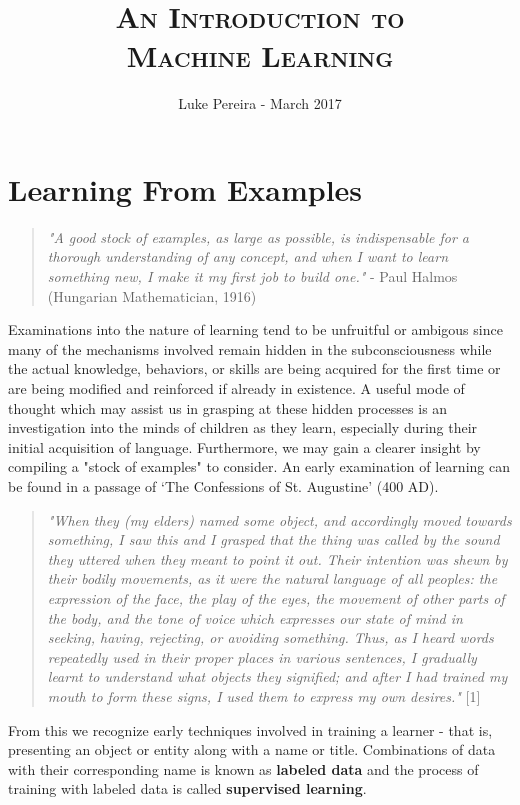 \documentclass[12pt]{article}
\title{\textsc {An Introduction to \\ Machine Learning}}
\author{Luke Pereira - March 2017 }
\date{}
\begin{document}
\maketitle
\section*{Learning From Examples }

\begin{quotation}
\noindent
\textit{
"A good stock of examples, as large as possible, is indispensable for a thorough understanding of any concept, and when I want to learn something new, I make it my first job to build one."} - Paul Halmos (Hungarian Mathematician, 1916)
\end{quotation}
\noindent
Examinations into the nature of learning tend to be unfruitful or ambigous since many of the mechanisms involved remain hidden in the subconsciousness while the actual knowledge, behaviors, or skills are being acquired for the first time or are being modified and reinforced if already in existence. A useful mode of thought which may assist us in grasping at these hidden processes is an investigation into the minds of children as they learn, especially during their initial acquisition of language. Furthermore, we may gain a clearer insight by compiling a "stock of examples" to consider. An early examination of learning can be found in a passage of `The Confessions of St. Augustine' (400 AD).  
\begin{quotation}
\noindent
\textit{
"When they (my elders) named some object, and accordingly moved towards something, I saw this and I grasped that the thing was called by the sound they uttered when they meant to point it out. Their intention was shewn by their bodily movements, as it were the natural language of all peoples: the expression of the face, the play of the eyes, the movement of other parts of the body, and the tone of voice which expresses our state of mind in seeking, having, rejecting, or avoiding something. Thus, as I heard words repeatedly used in their proper places in various sentences, I gradually learnt to understand what objects they signified; and after I had trained my mouth to form these signs, I used them to express my own desires."} [1]

\end{quotation}
From this we recognize early techniques involved in training a learner - that is, presenting an object or entity along with a name or title. Combinations of data with their corresponding name is known as \textbf{labeled data} and the process of training with labeled data is called \textbf{supervised learning}. 
\end{document}

